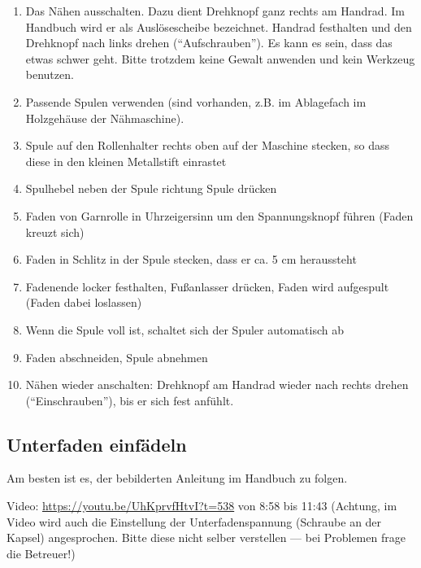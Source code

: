 \documentclass{\basedir/fablab-document}
\begin{document}
\begin{enumerate}
	\item Das Nähen ausschalten. Dazu dient Drehknopf ganz rechts am Handrad. Im Handbuch wird er als Auslösescheibe bezeichnet. Handrad festhalten und den Drehknopf nach links drehen (\enquote{Aufschrauben}). Es kann es sein, dass das etwas schwer geht. Bitte trotzdem keine Gewalt anwenden und kein Werkzeug benutzen.
	\item Passende Spulen verwenden (sind vorhanden, z.B. im Ablagefach im Holzgehäuse der Nähmaschine).
	\item Spule auf den Rollenhalter rechts oben auf der Maschine stecken, so dass diese in den kleinen Metallstift einrastet
	\item Spulhebel neben der Spule richtung Spule drücken
	\item Faden von Garnrolle in Uhrzeigersinn um den Spannungsknopf führen (Faden kreuzt sich)
	\item Faden in Schlitz in der Spule stecken, dass er ca. 5 cm heraussteht
	\item Fadenende locker festhalten, Fußanlasser drücken, Faden wird aufgespult (Faden dabei loslassen)
	\item Wenn die Spule voll ist, schaltet sich der Spuler automatisch ab
	\item Faden abschneiden, Spule abnehmen
	\item Nähen wieder anschalten: Drehknopf am Handrad wieder nach rechts drehen (\enquote{Einschrauben}), bis er sich fest anfühlt.
\end{enumerate}


\subsection{Unterfaden einfädeln}

Am besten ist es, der bebilderten Anleitung im Handbuch zu folgen.

Video: \url{https://youtu.be/UhKprvfHtvI?t=538} von 8:58 bis 11:43 (Achtung, im Video wird auch die Einstellung der Unterfadenspannung (Schraube an der Kapsel) angesprochen. Bitte diese nicht selber verstellen --- bei Problemen frage die Betreuer!)
\end{document}
